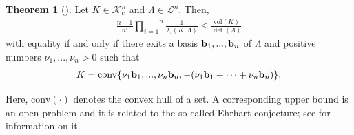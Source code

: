 \documentclass{amsart}
\theoremstyle{definition}
\newtheorem{theoman}{Theorem}[section]
\theoremstyle{remark}
\numberwithin{equation}{section}
\begin{document}
\begin{theoman}[\cite{hhh2016}]\label{lvsm2016}
    Let $K\in\mathcal{K}_c^n$ and $\Lambda\in\mathcal{L}^n$. Then,
    \begin{align*}
         \frac{n+1}{n!}\overset{n}{\underset{i=1}{\prod}}\frac{1}{\lambda_i(K,\Lambda)}\le\frac{\mathrm{vol}(K)}{\det(\Lambda)}
    \end{align*}
 with equality  if and only if there exits a basis ${\bf b}_1,...,{\bf b}_n$ of $\Lambda$ and  positive numbers $\nu_1,...,\nu_n>0$ such that
 \begin{align*}
     K=\mathrm{conv}\{\nu_1{\bf b}_1,...,\nu_n{\bf b}_n,-(\nu_1{\bf b}_1+\cdots+\nu_n{\bf b}_n)\}.
 \end{align*}
\end{theoman}
Here, $\mathrm{conv}(\cdot)$ denotes the convex hull of a set. A corresponding upper bound is an open problem and it is related to the so-called Ehrhart conjecture; see \cite{ahenk2023} for information on it.
\end{document}
